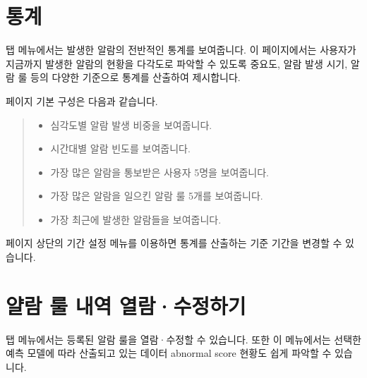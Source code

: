 \documentclass[letterpaper,10pt,english]{sphinxmanual}
\begin{document}
\chapter{통계}
\label{\detokenize{anomaly/part03/index:statistics}}\label{\detokenize{anomaly/part03/index:id1}}\label{\detokenize{anomaly/part03/index::doc}}
 탭 메뉴에서는 발생한 알람의 전반적인 통계를 보여줍니다. 이 페이지에서는 사용자가 지금까지 발생한 알람의 현황을 다각도로 파악할 수 있도록 중요도, 알람 발생 시기, 알람 룰 등의 다양한 기준으로 통계를 산출하여 제시합니다.

페이지 기본 구성은 다음과 같습니다.
\begin{quote}

\begin{figure}[H]
\centering

\noindent{}
\end{figure}
\begin{itemize}
\item {} 
 심각도별 알람 발생 비중을 보여줍니다.

\item {} 
 시간대별 알람 빈도를 보여줍니다.

\item {} 
 가장 많은 알람을 통보받은 사용자 5명을 보여줍니다.

\item {} 
 가장 많은 알람을 일으킨 알람 룰 5개를 보여줍니다.

\item {} 
 가장 최근에 발생한 알람들을 보여줍니다.

\end{itemize}
\end{quote}

페이지 상단의 기간 설정 메뉴를 이용하면 통계를 산출하는 기준 기간을 변경할 수 있습니다.
\begin{quote}

\begin{figure}[H]
\centering

\noindent{}
\end{figure}
\end{quote}


\chapter{얄람 룰 내역 열람·수정하기}
\label{\detokenize{anomaly/part04/index:id1}}\label{\detokenize{anomaly/part04/index::doc}}
 탭 메뉴에서는 등록된 알람 룰을 열람·수정할 수 있습니다. 또한 이 메뉴에서는 선택한 예측 모델에 따라 산출되고 있는 데이터 abnormal score 현황도 쉽게 파악할 수 있습니다.
\end{document}
